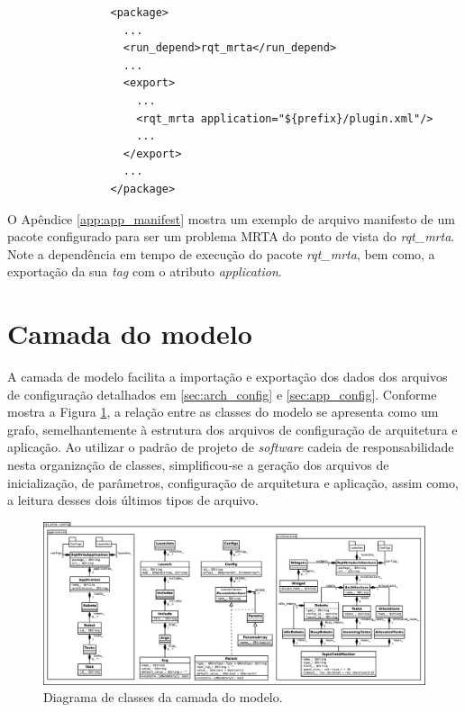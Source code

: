             \begin{lstlisting}
                <package>
                  ...
                  <run_depend>rqt_mrta</run_depend>
                  ...
                  <export>
                    ...
                    <rqt_mrta application="${prefix}/plugin.xml"/>
                    ...
                  </export>
                  ...
                </package>
            \end{lstlisting}
            
            O Apêndice \ref{app:app_manifest} mostra um exemplo de arquivo manifesto de um pacote configurado para ser um problema MRTA do ponto de vista do \textit{rqt\_mrta}. Note a dependência em tempo de execução do pacote \textit{rqt\_mrta}, bem como, a exportação da sua \textit{tag} com o atributo \textit{application}.
    
    \section{Camada do modelo} \label{subset:rqt_mrta_model}
        A camada de modelo facilita a importação e exportação dos dados dos arquivos de configuração detalhados em \ref{sec:arch_config} e \ref{sec:app_config}. Conforme mostra a Figura \ref{fig:rqt_mrta_model_uml}, a relação entre as classes do modelo se apresenta como um grafo, semelhantemente à estrutura dos arquivos de configuração de arquitetura e aplicação. Ao utilizar o padrão de projeto de \textit{software} cadeia de responsabilidade \cite{ref:gamma1993design} nesta organização de classes, simplificou-se a geração dos arquivos de inicialização, de parâmetros, configuração de arquitetura e aplicação, assim como, a leitura desses dois últimos tipos de arquivo.
        
        \begin{figure}[p]
            \centering
            \includegraphics[width=.97\textheight,angle=90]{Figuras/3_desenvolvimento/rqt_mrta_model_uml.eps}
            \caption{Diagrama de classes da camada do modelo.} \label{fig:rqt_mrta_model_uml}
        \end{figure}
        
